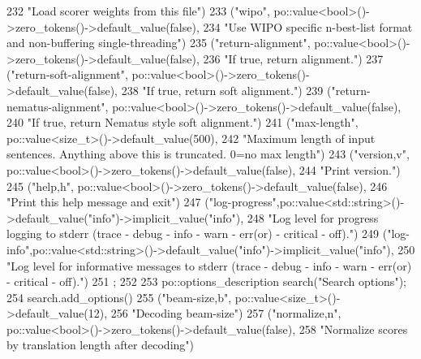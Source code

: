 \begin{DoxyCode}
232      \textcolor{stringliteral}{"Load scorer weights from this file"})
233     (\textcolor{stringliteral}{"wipo"}, po::value<bool>()->zero\_tokens()->default\_value(\textcolor{keyword}{false}),
234      \textcolor{stringliteral}{"Use WIPO specific n-best-list format and non-buffering single-threading"})
235     (\textcolor{stringliteral}{"return-alignment"}, po::value<bool>()->zero\_tokens()->default\_value(\textcolor{keyword}{false}),
236      \textcolor{stringliteral}{"If true, return alignment."})
237     (\textcolor{stringliteral}{"return-soft-alignment"}, po::value<bool>()->zero\_tokens()->default\_value(\textcolor{keyword}{false}),
238      \textcolor{stringliteral}{"If true, return soft alignment."})
239     (\textcolor{stringliteral}{"return-nematus-alignment"}, po::value<bool>()->zero\_tokens()->default\_value(\textcolor{keyword}{false}),
240      \textcolor{stringliteral}{"If true, return Nematus style soft alignment."})
241     (\textcolor{stringliteral}{"max-length"}, po::value<size\_t>()->default\_value(500),
242       \textcolor{stringliteral}{"Maximum length of input sentences. Anything above this is truncated. 0=no max length"})
243     (\textcolor{stringliteral}{"version,v"}, po::value<bool>()->zero\_tokens()->default\_value(\textcolor{keyword}{false}),
244      \textcolor{stringliteral}{"Print version."})
245     (\textcolor{stringliteral}{"help,h"}, po::value<bool>()->zero\_tokens()->default\_value(\textcolor{keyword}{false}),
246      \textcolor{stringliteral}{"Print this help message and exit"})
247     (\textcolor{stringliteral}{"log-progress"},po::value<std::string>()->default\_value(\textcolor{stringliteral}{"info"})->implicit\_value(\textcolor{stringliteral}{"info"}),
248      \textcolor{stringliteral}{"Log level for progress logging to stderr (trace - debug - info - warn - err(or) - critical - off)."})
249     (\textcolor{stringliteral}{"log-info"},po::value<std::string>()->default\_value(\textcolor{stringliteral}{"info"})->implicit\_value(\textcolor{stringliteral}{"info"}),
250      \textcolor{stringliteral}{"Log level for informative messages to stderr (trace - debug - info - warn - err(or) - critical -
       off)."})
251   ;
252 
253   po::options\_description search(\textcolor{stringliteral}{"Search options"});
254   search.add\_options()
255     (\textcolor{stringliteral}{"beam-size,b"}, po::value<size\_t>()->default\_value(12),
256      \textcolor{stringliteral}{"Decoding beam-size"})
257     (\textcolor{stringliteral}{"normalize,n"}, po::value<bool>()->zero\_tokens()->default\_value(\textcolor{keyword}{false}),
258      \textcolor{stringliteral}{"Normalize scores by translation length after decoding"})

\end{DoxyCode}
